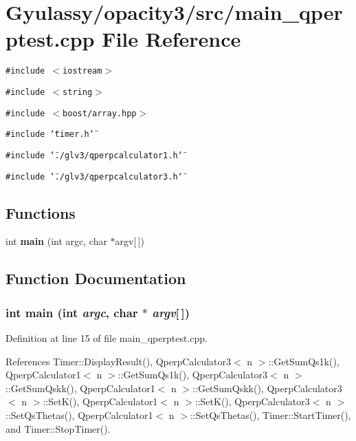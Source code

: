\section{Gyulassy/opacity3/src/main\_\-qperptest.cpp File Reference}
\label{main__qperptest_8cpp}
{\tt \#include $<$iostream$>$}\par
{\tt \#include $<$string$>$}\par
{\tt \#include $<$boost/array.hpp$>$}\par
{\tt \#include \char`\"{}timer.h\char`\"{}}\par
{\tt \#include \char`\"{}./glv3/qperpcalculator1.h\char`\"{}}\par
{\tt \#include \char`\"{}./glv3/qperpcalculator3.h\char`\"{}}\par
\subsection*{Functions}
\begin{CompactItemize}
\item 
int {\bf main} (int argc, char $\ast$argv[$\,$])
\end{CompactItemize}


\subsection{Function Documentation}
\subsubsection{\setlength{\rightskip}{0pt plus 5cm}int main (int {\em argc}, char $\ast$ {\em argv}[$\,$])}\label{main__qperptest_8cpp_0ddf1224851353fc92bfbff6f499fa97}




Definition at line 15 of file main\_\-qperptest.cpp.

References Timer::DisplayResult(), QperpCalculator3$<$ n $>$::GetSumQs1k(), QperpCalculator1$<$ n $>$::GetSumQs1k(), QperpCalculator3$<$ n $>$::GetSumQskk(), QperpCalculator1$<$ n $>$::GetSumQskk(), QperpCalculator3$<$ n $>$::SetK(), QperpCalculator1$<$ n $>$::SetK(), QperpCalculator3$<$ n $>$::SetQsThetas(), QperpCalculator1$<$ n $>$::SetQsThetas(), Timer::StartTimer(), and Timer::StopTimer().


